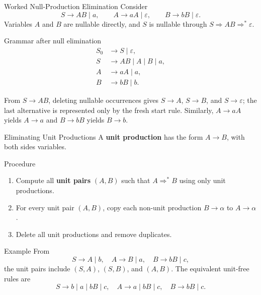 \documentclass[10pt]{beamer}
\begin{document}
\begin{frame}{Worked Null-Production Elimination}
  \small
  Consider
  \[
    S\to AB\mid a,\qquad
    A\to aA\mid\varepsilon,\qquad
    B\to bB\mid\varepsilon.
  \]
  Variables $A$ and $B$ are nullable directly, and $S$ is nullable through
  $S\Rightarrow AB\Rightarrow^*\varepsilon$.
  \begin{block}{Grammar after null elimination}
    \[
      \begin{aligned}
        S_0&\to S\mid\varepsilon,\\
        S&\to AB\mid A\mid B\mid a,\\
        A&\to aA\mid a,\\
        B&\to bB\mid b.
      \end{aligned}
    \]
  \end{block}
  From $S\to AB$, deleting nullable occurrences gives $S\to A$, $S\to B$,
  and $S\to\varepsilon$; the last alternative is represented only by the
  fresh start rule. Similarly, $A\to aA$ yields $A\to a$ and
  $B\to bB$ yields $B\to b$.
\end{frame}

\begin{frame}{Eliminating Unit Productions}
  \small
  A \textbf{unit production} has the form $A\to B$, with both sides variables.
  \begin{block}{Procedure}
    \begin{enumerate}
      \item Compute all \textbf{unit pairs} $(A,B)$ such that
        $A\Rightarrow^* B$ using only unit productions.
      \item For every unit pair $(A,B)$, copy each non-unit production
        $B\to\alpha$ to $A\to\alpha$.
      \item Delete all unit productions and remove duplicates.
    \end{enumerate}
  \end{block}
  \begin{exampleblock}{Example}
    From
    \[
      S\to A\mid b,\quad A\to B\mid a,\quad B\to bB\mid c,
    \]
    the unit pairs include $(S,A)$, $(S,B)$, and $(A,B)$. The equivalent
    unit-free rules are
    \[
      S\to b\mid a\mid bB\mid c,\quad
      A\to a\mid bB\mid c,\quad
      B\to bB\mid c.
    \]
  \end{exampleblock}
\end{frame}
\end{document}
